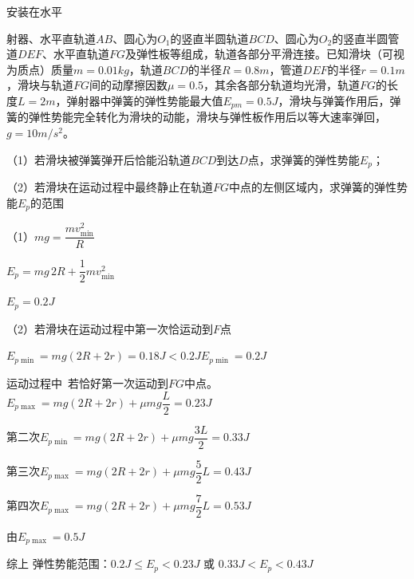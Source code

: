 \begin{problem}
安装在水平%

射器、水平直轨道$AB$、圆心为$O_1$的竖直半圆轨道$BCD$、圆心为$O_2$的竖直半圆管道$DEF$、水平直轨道$FG$及弹性板等组成，轨道各部分平滑连接。已知滑块（可视为质点）质量$m=0.01\unit{kg}$，轨道$BCD$的半径$R=0.8\unit{m}$，管道$DEF$的半径$r=0.1\unit{m}$，滑块与轨道$FG$间的动摩擦因数$\mu=0.5$，其余各部分轨道均光滑，轨道$FG$的长度$L=2\unit{m}$，弹射器中弹簧的弹性势能最大值$E_{pm}=0.5\unit{J}$，滑块与弹簧作用后，弹簧的弹性势能完全转化为滑块的动能，滑块与弹性板作用后以等大速率弹回，$g=10\unit{m/s^2}$。

（1）若滑块被弹簧弹开后恰能沿轨道$BCD$到达$D$点，求弹簧的弹性势能$E_p$；

（2）若滑块在运动过程中最终静止在轨道$FG$中点的左侧区域内，求弹簧的弹性势能$E_p$的范围
\begin{solution}
（1）$mg=\dfrac{mv_{\min}^2}{R}$

$E_p=mg\,2R+\dfrac{1}{2}mv_{\min}^2$

$E_p=0.2\unit{J}$

（2）若滑块在运动过程中第一次恰运动到$F$点

$E_{p\min}=mg(2R+2r)=0.18\unit{J}<0.2\unit{J}$\qquad $E_{p\min}=0.2\unit{J}$

运动过程中\ 若恰好第一次运动到$FG$中点。\ $E_{p\max}=mg(2R+2r)+\mu mg\dfrac{L}{2}=0.23\unit{J}$%

第二次\quad $E_{p\min}=mg(2R+2r)+\mu mg\dfrac{3L}{2}=0.33\unit{J}$

第三次\quad $E_{p\max}=mg(2R+2r)+\mu mg\dfrac{5}{2}L=0.43\unit{J}$

第四次\quad $E_{p\max}=mg(2R+2r)+\mu mg\dfrac{7}{2}L=0.53\unit{J}$

由$E_{p\max}=0.5\unit{J}$

综上 弹性势能范围：$0.2\unit{J}\le E_p<0.23\unit{J}$ 或 $0.33\unit{J}<E_p<0.43\unit{J}$
\end{solution}
\end{problem}
